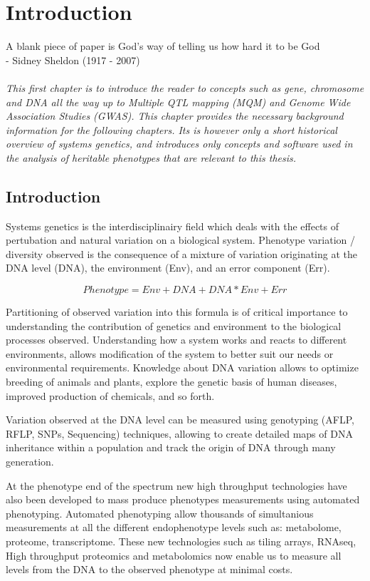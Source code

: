 \chapter{Introduction}

A blank piece of paper is God's way of telling us how hard it to be God\\
- Sidney Sheldon (1917 - 2007)\\\\

\emph{This first chapter is to introduce the reader to concepts such as gene, chromosome 
and DNA all the way up to Multiple QTL mapping (MQM) and Genome Wide Association Studies 
(GWAS). This chapter provides the necessary background information for the following 
chapters. Its is however only a short historical overview of systems genetics, and 
introduces only concepts and software used in the analysis of heritable phenotypes that 
are relevant to this thesis. }

\null
\vfill
\newpage

\section{Introduction}
Systems genetics is the interdisciplinairy field which deals with the effects of 
pertubation and natural variation on a biological system. Phenotype variation / 
diversity observed is the consequence of a mixture of variation originating at the 
DNA level (DNA), the environment (Env), and an error component (Err).

$$ Phenotype = Env + DNA + DNA * Env + Err $$

Partitioning of observed variation into this formula is of critical importance 
to understanding the contribution of genetics and environment to the biological 
processes observed. Understanding how a system works and reacts to different 
environments, allows modification of the system to better suit our needs or 
environmental requirements. Knowledge about DNA variation allows to optimize 
breeding of animals and plants, explore the genetic basis of human diseases, 
improved production of chemicals, and so forth.

Variation observed at the DNA level can be measured using genotyping (AFLP, RFLP, 
SNPs, Sequencing) techniques, allowing to create detailed maps of DNA inheritance 
within a population and track the origin of DNA through many generation.

At the phenotype end of the spectrum new high throughput technologies have also 
been developed to mass produce phenotypes measurements using automated phenotyping. 
Automated phenotyping allow thousands of simultanious measurements at all the 
different endophenotype levels such as: metabolome, proteome, transcriptome. These 
new technologies such as tiling arrays, RNAseq, High throughput proteomics and 
metabolomics now enable us to measure all levels from the DNA to the observed 
phenotype at minimal costs.


